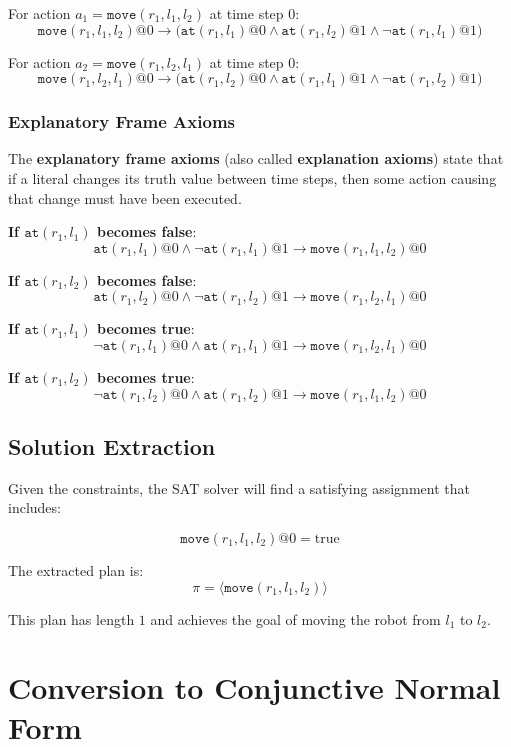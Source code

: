 \documentclass[11pt,a4paper]{article}
\theoremstyle{definition}
\theoremstyle{plain}
\theoremstyle{remark}
\begin{document}
For action $a_1 = \texttt{move}(r_1, l_1, l_2)$ at time step $0$:
\[
\texttt{move}(r_1, l_1, l_2)@0 \rightarrow \big(\texttt{at}(r_1, l_1)@0 \land \texttt{at}(r_1, l_2)@1 \land \neg \texttt{at}(r_1, l_1)@1\big)
\]

For action $a_2 = \texttt{move}(r_1, l_2, l_1)$ at time step $0$:
\[
\texttt{move}(r_1, l_2, l_1)@0 \rightarrow \big(\texttt{at}(r_1, l_2)@0 \land \texttt{at}(r_1, l_1)@1 \land \neg \texttt{at}(r_1, l_2)@1\big)
\]

\subsubsection{Explanatory Frame Axioms}

The \textbf{explanatory frame axioms} (also called \textbf{explanation axioms}) state that if a literal changes its truth value between time steps, then some action causing that change must have been executed.

\textbf{If $\texttt{at}(r_1, l_1)$ becomes false}:
\[
\texttt{at}(r_1, l_1)@0 \land \neg \texttt{at}(r_1, l_1)@1 \rightarrow \texttt{move}(r_1, l_1, l_2)@0
\]

\textbf{If $\texttt{at}(r_1, l_2)$ becomes false}:
\[
\texttt{at}(r_1, l_2)@0 \land \neg \texttt{at}(r_1, l_2)@1 \rightarrow \texttt{move}(r_1, l_2, l_1)@0
\]

\textbf{If $\texttt{at}(r_1, l_1)$ becomes true}:
\[
\neg \texttt{at}(r_1, l_1)@0 \land \texttt{at}(r_1, l_1)@1 \rightarrow \texttt{move}(r_1, l_2, l_1)@0
\]

\textbf{If $\texttt{at}(r_1, l_2)$ becomes true}:
\[
\neg \texttt{at}(r_1, l_2)@0 \land \texttt{at}(r_1, l_2)@1 \rightarrow \texttt{move}(r_1, l_1, l_2)@0
\]

\subsection{Solution Extraction}

Given the constraints, the SAT solver will find a satisfying assignment that includes:

\[
\texttt{move}(r_1, l_1, l_2)@0 = \text{true}
\]

The extracted plan is:
\[
\pi = \langle \texttt{move}(r_1, l_1, l_2) \rangle
\]

This plan has length $1$ and achieves the goal of moving the robot from $l_1$ to $l_2$.

\section{Conversion to Conjunctive Normal Form}
\end{document}
